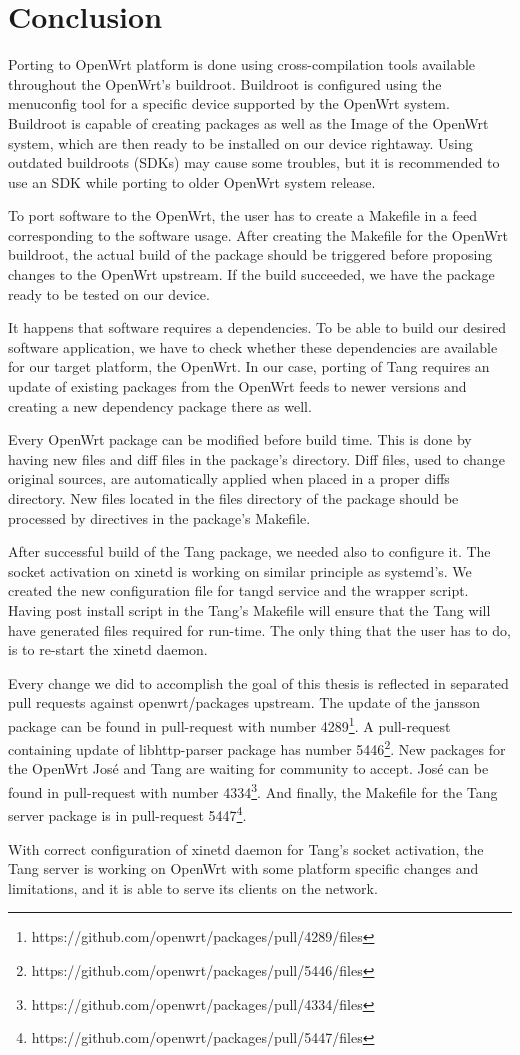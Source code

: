 \chapter{Conclusion}\label{conlusion}


Porting to OpenWrt platform is done using cross-compilation tools available throughout the OpenWrt's buildroot.
Buildroot is configured using the menuconfig tool for a specific device supported by the OpenWrt system.
Buildroot is capable of creating packages as well as the Image of the OpenWrt system, which are then ready to be installed on our device rightaway.
Using outdated buildroots (SDKs) may cause some troubles, but it is recommended to use an SDK while porting to older OpenWrt system release.

To port software to the OpenWrt, the user has to create a Makefile in a feed corresponding to the software usage.
After creating the Makefile for the OpenWrt buildroot, the actual build of the package should be triggered before proposing changes to the OpenWrt upstream.
If the build succeeded, we have the package ready to be tested on our device.

It happens that software requires a dependencies.
To be able to build our desired software application, we have to check whether these dependencies are available for our target platform, the OpenWrt.
In our case, porting of Tang requires an update of existing packages from the OpenWrt feeds to newer versions and creating a new dependency package there as well.

Every OpenWrt package can be modified before build time.
This is done by having new files and diff files in the package's directory.
Diff files, used to change original sources, are automatically applied when placed in a proper diffs directory.
New files located in the files directory of the package should be processed by directives in the package's Makefile.

After successful build of the Tang package, we needed also to configure it.
The socket activation on xinetd is working on similar principle as systemd's.
We created the new configuration file for tangd service and the wrapper script.
Having post install script in the Tang's Makefile will ensure that the Tang will have generated files required for run-time.
The only thing that the user has to do, is to re-start the xinetd daemon.

Every change we did to accomplish the goal of this thesis is reflected in separated pull requests against openwrt/packages upstream.
The update of the jansson package can be found in pull-request with number 4289\footnote{https://github.com/openwrt/packages/pull/4289/files}.
A pull-request containing update of libhttp-parser package has number 5446\footnote{https://github.com/openwrt/packages/pull/5446/files}.
New packages for the OpenWrt José and Tang are waiting for community to accept.
José can be found in pull-request with number 4334\footnote{https://github.com/openwrt/packages/pull/4334/files}.
And finally, the Makefile for the Tang server package is in pull-request 5447\footnote{https://github.com/openwrt/packages/pull/5447/files}.

With correct configuration of xinetd daemon for Tang's socket activation, the Tang server is working on OpenWrt with some platform specific changes and limitations, and it is able to serve its clients on the network.
